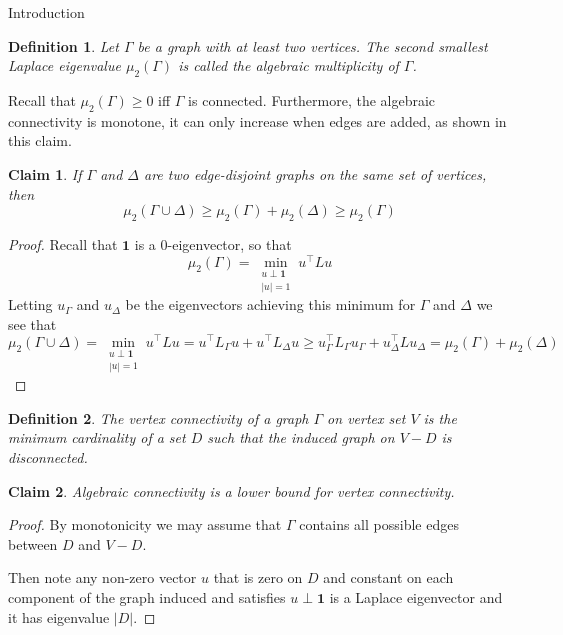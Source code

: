\documentclass{article}
\newtheorem{claim}{Claim}
\newtheorem{defn}{Definition}
\begin{document}
\begin{section}{Introduction}
  \begin{defn}
  Let $\Gamma$ be a graph with at least two vertices.
  The second smallest Laplace eigenvalue $\mu_2(\Gamma)$ is called the \emph{algebraic multiplicity} of $\Gamma$.
  \end{defn}

  Recall that $\mu_2(\Gamma) \geq 0$ iff $\Gamma$ is connected.
  Furthermore, the algebraic connectivity is monotone, it can only increase when edges are added, as shown in this claim.

  \begin{claim}
    If $\Gamma$ and $\Delta$ are two edge-disjoint graphs on the same set of vertices, then
    $$
    \mu_2(\Gamma \cup \Delta) \geq \mu_2(\Gamma) + \mu_2(\Delta) \geq \mu_2(\Gamma)
    $$
  \end{claim}
  \begin{proof}
    Recall that $\mathbf 1$ is a 0-eigenvector, so that
    $$
    \mu_2(\Gamma) = \min_{\substack{u \perp \mathbf 1 \\ |u| = 1}} u^\intercal L u
    $$
    Letting $u_\Gamma$ and $u_\Delta$ be the eigenvectors achieving this minimum for $\Gamma$ and $\Delta$ we see that
    $$
    \mu_2(\Gamma \cup \Delta) = \min_{\substack{u \perp \mathbf 1 \\ |u| = 1}} u^\intercal L u = u^\intercal L_\Gamma u + u^\intercal L_\Delta u \geq u_\Gamma^\intercal L_\Gamma u_\Gamma + u_\Delta^\intercal L u_\Delta = \mu_2(\Gamma) + \mu_2(\Delta)
    $$
  \end{proof}

  \begin{defn}
    The \emph{vertex connectivity} of a graph $\Gamma$ on vertex set $V$ is the minimum cardinality of a set $D$ such that the induced graph on $V - D$ is disconnected.
  \end{defn}


  \begin{claim}
    Algebraic connectivity is a lower bound for vertex connectivity.
  \end{claim}
  \begin{proof}
    By monotonicity we may assume that $\Gamma$ contains all possible edges between $D$ and $V - D$.

    Then note any non-zero vector $u$ that is zero on $D$ and constant on each component of the graph induced and satisfies $u \perp \mathbf 1$ is a Laplace eigenvector and it has eigenvalue $|D|$.


\end{proof}
\end{section}
\end{document}
